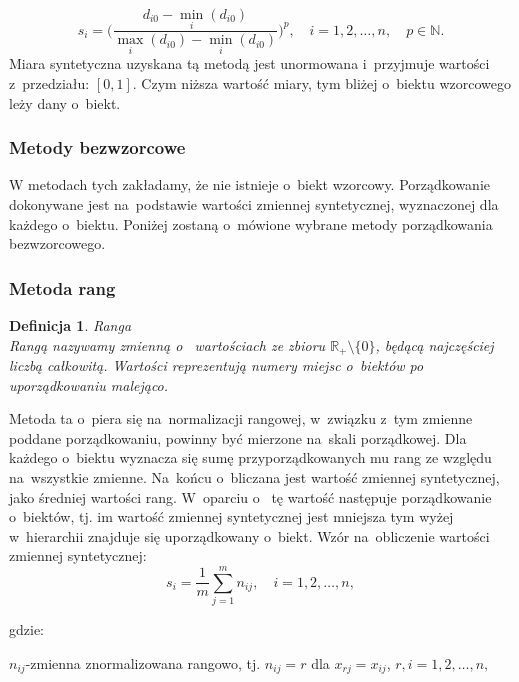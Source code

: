 \documentclass[12pt,a4paper]{report}
\newtheorem{definition}[theorem]{Definicja}
\begin{document}
$$s_{i}=\bigg(\frac{d_{i0}-\min\limits_{i}(d_{i0})}{\max\limits_{i}(d_{i0})-\min\limits_{i}(d_{i0})} \bigg)^{p}, \quad i=1,2,\dots,n, \quad p \in \mathbb{N}.
$$
Miara syntetyczna uzyskana tą metodą jest unormowana i~przyjmuje wartości z~przedziału: $[0,1]$. Czym niższa wartość miary, tym bliżej o~biektu wzorcowego leży dany o~biekt. 
\subsubsection{Metody bezwzorcowe}


W metodach tych zakładamy, że nie istnieje o~biekt wzorcowy. %
Porządkowanie dokonywane jest na~podstawie wartości zmiennej syntetycznej, wyznaczonej dla każdego o~biektu. 
Poniżej zostaną o~mówione wybrane metody porządkowania bezwzorcowego.

\subsubsection{Metoda rang}

\begin{definition}{Ranga \cite[Rozdział 1.5]{panek2013}}\\
Rangą nazywamy zmienną o~ wartościach ze zbioru ${\mathbb{R}_{+}\setminus{\{0\}}}$, będącą najczęściej liczbą całkowitą. Wartości reprezentują numery miejsc o~biektów po uporządkowaniu malejąco.
\end{definition}
Metoda ta o~piera się na~normalizacji rangowej, w~związku z~tym zmienne poddane porządkowaniu, powinny być mierzone na~skali porządkowej. Dla każdego o~biektu wyznacza się sumę przyporządkowanych mu rang ze względu na~wszystkie zmienne. Na~końcu o~bliczana jest wartość zmiennej syntetycznej, jako średniej wartości rang. W~oparciu o~ tę wartość następuje porządkowanie o~biektów, tj. im wartość zmiennej syntetycznej jest mniejsza tym wyżej w~hierarchii znajduje się uporządkowany o~biekt. Wzór na~obliczenie wartości zmiennej syntetycznej: 
$$
s_{i}=\frac{1}{m}\sum_{j=1}^{m} n_{ij},\quad i=1, 2, \ldots, n,
$$

gdzie:

$n_{ij}$-zmienna znormalizowana rangowo, tj. $n_{ij}=r$ dla $x_{rj}=x_{ij}$,
$r,i=1, 2, \ldots, n,$
\end{document}
